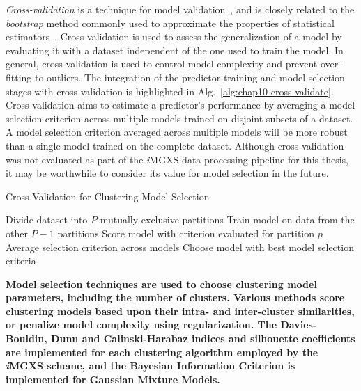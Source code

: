 \textit{Cross-validation} is a technique for model validation~\cite{kohavi1995cv}, and is closely related to the \textit{bootstrap} method commonly used to approximate the properties of statistical estimators~\cite{efron1994bootstrap}. Cross-validation is used to assess the generalization of a model by evaluating it with a dataset independent of the one used to train the model. In general, cross-validation is used to control model complexity and prevent over-fitting to outliers. The integration of the predictor training and model selection stages with cross-validation is highlighted in Alg.~\ref{alg:chap10-cross-validate}. Cross-validation aims to estimate a predictor's performance by averaging a model selection criterion across multiple models trained on disjoint subsets of a dataset. A model selection criterion averaged across multiple models will be more robust than a single model trained on the complete dataset. Although cross-validation was not evaluated as part of the \textit{i}\ac{MGXS} data processing pipeline for this thesis, it may be worthwhile to consider its value for model selection in the future.

\begin{algorithm}[h!]
\caption[Cross-Validation]{Cross-Validation for Clustering Model Selection}
\label{alg:chap10-cross-validate}
\begin{algorithmic}[1]
  \State Divide dataset into $P$ mutually exclusive partitions
      \State Train model on data from the other $P-1$ partitions
      \State Score model with criterion evaluated for partition $p$ 
    \EndFor
    \State Average selection criterion across models
  \EndFor
  \State Choose model with best model selection criteria
\end{algorithmic}
\end{algorithm}

\clearpage

\begin{emphbox}
\textbf{Model selection techniques are used to choose clustering model parameters, including the number of clusters. Various methods score clustering models based upon their intra- and inter-cluster similarities, or penalize model complexity using regularization. The Davies-Bouldin, Dunn and Calinski-Harabaz indices and silhouette coefficients are implemented for each clustering algorithm employed by the \textit{i}\ac{MGXS} scheme, and the Bayesian Information Criterion is implemented for Gaussian Mixture Models.}
\end{emphbox}


